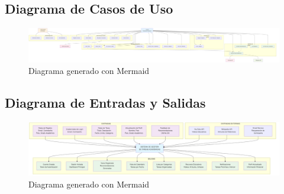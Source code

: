 \documentclass{pretexto/report}
\begin{document}
\begin{landscape}
\landscapefancy  %

\subsection{Diagrama de Casos de Uso}
\begin{figure}[H]
    \centering
    \includegraphics[width=\linewidth]{pngs/use_cases.png}
    \caption{Diagrama generado con Mermaid}
\end{figure}

\subsection{Diagrama de Entradas y Salidas}
\begin{figure}[H]
    \centering
    \includegraphics[width=\linewidth]{pngs/e_s.png}
    \caption{Diagrama generado con Mermaid}
\end{figure}

\end{landscape}




\pagebreak
\printbibliography[heading=bibintoc]
\end{document}
